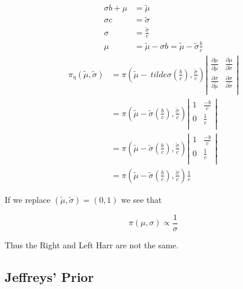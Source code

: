 \documentclass[11pt,fleqn]{book} %
\begin{document}
\begin{example}
				\begin{align*}
					\sigma b + \mu &= \tilde{\mu}\\
					\sigma c &= \tilde{\sigma}\\
					\sigma &= \frac{\tilde{\sigma}}{c}\\
					\mu &= \tilde{\mu} - \sigma b = \tilde{\mu} - \tilde{\sigma}\frac{b}{c}
				\end{align*}
				\begin{align*}
					\pi_\eta(\tilde{\mu}, \tilde{\sigma}) &= \pi(\tilde{\mu} - \	tilde{\sigma}(\frac{b}{c}), \frac{\tilde{\sigma}}{c}) \left|\begin{matrix}
						\frac{\partial \mu}{\partial \tilde{\mu}} & \frac{\partial \mu}{\partial \tilde{\sigma}}\\
						\frac{\partial \sigma}{\partial \tilde{\mu}} & \frac{\partial \sigma}{\partial \tilde{\sigma}}\\
						\end{matrix}\right|\\
					&= \pi(\tilde{\mu} - \tilde{\sigma}(\frac{b}{c}), \frac{\tilde{\sigma}}{c}) \left|\begin{matrix}
						1 & \frac{-b}{c}\\
						0 & \frac{1}{c}\\
						\end{matrix}\right|\\
					&= \pi(\tilde{\mu} - \tilde{\sigma}(\frac{b}{c}), \frac{\tilde{\sigma}}{c}) \left|\begin{matrix}
						1 & \frac{-b}{c}\\
						0 & \frac{1}{c}\\
						\end{matrix}\right|\\
					&= \pi(\tilde{\mu} - \tilde{\sigma}(\frac{b}{c}), \frac{\tilde{\sigma}}{c}) \frac{1}{c}
				\end{align*}

				If we replace $(\tilde{\mu}, \tilde{\sigma}) = (0, 1)$ we see that 

						$$ \pi(\mu, \sigma) \propto \frac{1}{\sigma} $$

				Thus the Right and Left Harr are not the same. 
\end{example}

	


\subsection{Jeffreys' Prior} %
\label{sub:Jeffrey}
\end{document}
